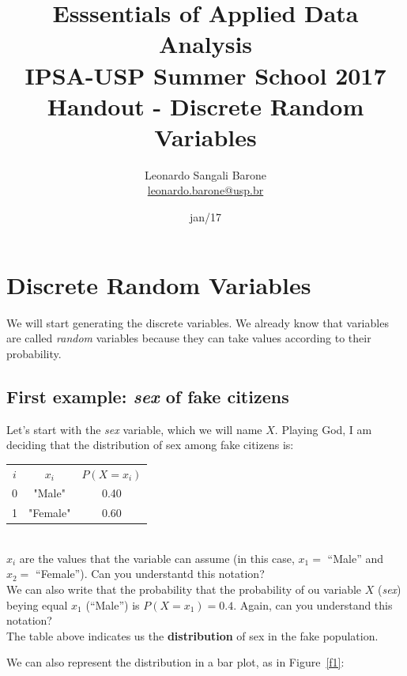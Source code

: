 \documentclass[11pt]{article}
\title{\textbf{Esssentials of Applied Data Analysis\\
				IPSA-USP Summer School 2017}\newline\\
				Handout - Discrete Random Variables}
\author{Leonardo Sangali Barone\\ \href{leonardo.barone@usp.br}{leonardo.barone@usp.br}}
\date{jan/17}
\begin{document}
\maketitle

\section*{Discrete Random Variables}

	We will start generating the discrete variables. We already know that variables are called \emph{random} variables because they can take values according to their probability.\\
	
	\subsection*{First example: \emph{sex} of fake citizens}
	
	Let's start with the \emph{sex} variable, which we will name $X$. Playing God, I am deciding that the distribution of sex among fake citizens is:\\
	
\begin{tabular}{|c|c|c|}
\hline
	$i$ & $x_i$ & $P(X=x_i)$\\
	\cline{1-3}
	0 & "Male" & 0.40\\
	1 & "Female" & 0.60\\
\hline
\end{tabular}\\

$x_i$ are the values that the variable can assume (in this case, $x_1 = $ ``Male'' and $x_2 = $ ``Female''). Can you understantd this notation?\\

We can also write that the probability that the probability of ou variable $X$ (\emph{sex}) beying equal $x_1$ (``Male'') is $P(X = x_1) = 0.4$. Again, can you understand this notation?\\

The table above indicates us the \textbf{distribution} of sex in the fake population.

We can also represent the distribution in a bar plot, as in Figure~\ref{f1}:
\end{document}
